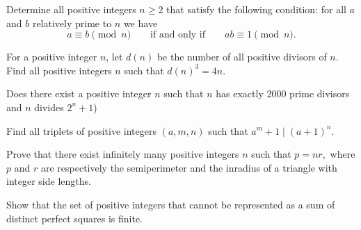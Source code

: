 \item[\textbf{N1.}]Determine all positive integers $ n\geq 2$ that satisfy the following condition: for all $ a$ and $ b$ relatively prime to $ n$ we have \[a \equiv b \pmod n\qquad\text{if and only if}\qquad ab\equiv 1 \pmod n.\]

\item[\textbf{N2.}]For a positive integer $n$,  let $d(n)$ be the number of all positive divisors of $n$. Find all positive integers $n$ such that $d(n)^3=4n$.

\item[\textbf{N3.}]Does there exist a positive integer $ n$ such that $ n$ has exactly 2000 prime divisors and $ n$ divides $ 2^n + 1$)

\item[\textbf{N4.}]Find all triplets of positive integers $ (a,m,n)$ such that  $ a^m + 1 \mid (a + 1)^n$.

\item[\textbf{N5.}]Prove that there exist infinitely many positive integers $ n$ such that $ p = nr,$ where $ p$ and $ r$ are respectively the semiperimeter and the inradius of a triangle with integer side lengths.

\item[\textbf{N6.}]Show that the set of positive integers that cannot be represented as a sum of distinct perfect squares is finite.